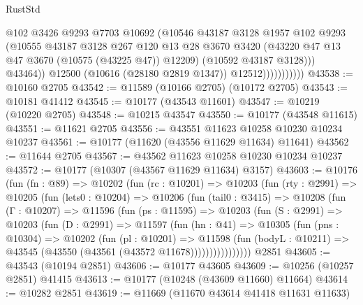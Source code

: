 \begin{lexlean}{RustStd}
\begin{coremodule}
                              @102
                              @3426
                              @9293
                              @7703
                              @10692
                              (@10546
                                @43187
                                @3128
                                @1957
                                @102
                                @9293
                                (@10555
                                  @43187
                                  @3128
                                  @267
                                  @120
                                  @13
                                  @28
                                  @3670
                                  @3420
                                  (@43220 @47 @13 @47 @3670 (@10575 (@43225 @47)) @12209)
                                  (@10592 @43187 @3128)))
                              @43464))
                          @12500
                          (@10616 (@28180 @2819 @1347))
                          @12512)))))))))))
@43538 := @10160 @2705
@43542 := @11589 (@10166 @2705) (@10172 @2705)
@43543 := @10181 @41412
@43545 := @10177 (@43543 @11601)
@43547 := @10219 (@10220 @2705)
@43548 := @10215 @43547
@43550 := @10177 (@43548 @11615)
@43551 := @11621 @2705
@43556 := @43551 @11623 @10258 @10230 @10234 @10237
@43561 := @10177 (@11620 (@43556 @11629 @11634) @11641)
@43562 := @11644 @2705
@43567 := @43562 @11623 @10258 @10230 @10234 @10237
@43572 := @10177 (@10307 (@43567 @11629 @11634) @3157)
@43603 := @10176
    (fun (fn : @89) =>
    @10202
      (fun (rc : @10201) =>
      @10203
        (fun (rty : @2991) =>
        @10205
          (fun (lets0 : @10204) =>
          @10206
            (fun (tail0 : @3415) =>
            @10208
              (fun (Γ : @10207) =>
              @11596
                (fun (ps : @11595) =>
                @10203
                  (fun (S : @2991) =>
                  @10203
                    (fun (D : @2991) =>
                    @11597
                      (fun (hn : @41) =>
                      @10305
                        (fun (pns : @10304) =>
                        @10202
                          (fun (pl : @10201) =>
                          @11598
                            (fun (bodyL : @10211) =>
                            @43545 (@43550 (@43561 (@43572 @11678))))))))))))))))
    @2851
@43605 := @43543 (@10194 @2851)
@43606 := @10177 @43605
@43609 := @10256 (@10257 @2851) @41415
@43613 := @10177 (@10248 (@43609 @11660) @11664)
@43614 := @10282 @2851
@43619 := @11669 (@11670 @43614 @41418 @11631 @11633)

\end{coremodule}
\end{lexlean}
